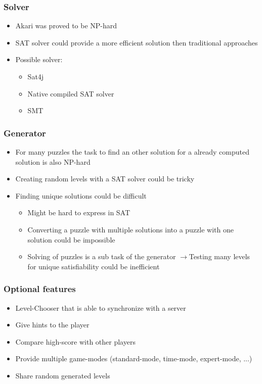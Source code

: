 \documentclass[xcolor=dvipsnames]{beamer}
\newcommand{\myarrowr}{$\rightarrow$\hspace{0.01\textwidth}}
\begin{document}
\begin{frame}
  \frametitle{Solver}
  \begin{itemize}
  \item Akari was proved to be NP-hard
  \item SAT solver could provide a more efficient solution then traditional approaches
  \item Possible solver:
   \begin{itemize}
     \item Sat4j
     \item Native compiled SAT solver
     \item SMT
   \end{itemize}
  \end{itemize}
\end{frame}


\begin{frame}
  \frametitle{Generator}
  \begin{itemize}
  \item For many puzzles the task to find an other solution for a already computed solution is also NP-hard 
  \item Creating random levels with a SAT solver could be tricky
  \item Finding unique solutions could be difficult
   \begin{itemize}
     \item Might be hard to express in SAT
     \item Converting a puzzle with multiple solutions into a puzzle with one solution could be impossible
     \item Solving of puzzles is a sub task of the generator \myarrowr  Testing many levels for unique satisfiability could be inefficient
   \end{itemize}
  \end{itemize}
\end{frame}


\begin{frame}
  \frametitle{Optional features}
  \begin{itemize}
  \item Level-Chooser that is able to synchronize with a server
  \item Give hints to the player
  \item Compare high-score with other players
  \item Provide multiple game-modes (standard-mode, time-mode, expert-mode, ...)
  \item Share random generated levels
  \end{itemize}
\end{frame}
\end{document}
